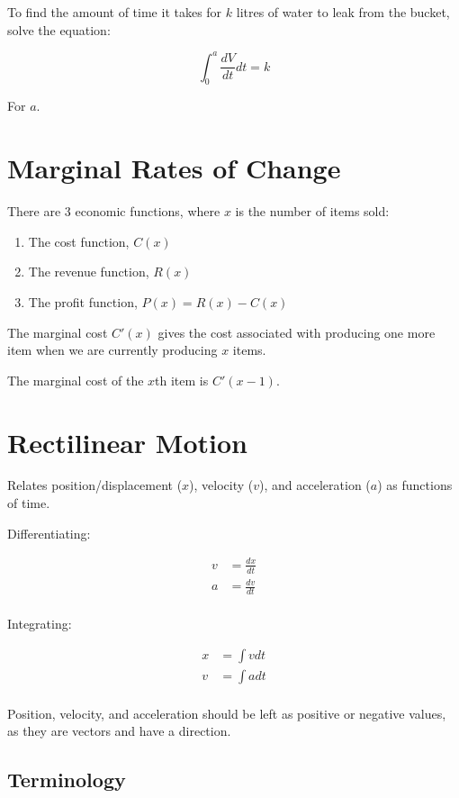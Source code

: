 \documentclass[a4paper,11pt]{article}
\begin{document}
To find the amount of time it takes for $k$ litres of water to leak from the
bucket, solve the equation:

$$
\int_0^a \frac{dV}{dt} dt = k
$$

For $a$.




\section{Marginal Rates of Change}

There are 3 economic functions, where $x$ is the number of items sold:

\begin{enumerate}
\item The cost function, $C(x)$
\item The revenue function, $R(x)$
\item The profit function, $P(x) = R(x) - C(x)$
\end{enumerate}

The marginal cost $C'(x)$ gives the cost associated with producing one more
item when we are currently producing $x$ items.

The marginal cost of the $x$th item is $C'(x - 1)$.




\section{Rectilinear Motion}

Relates position/displacement ($x$), velocity ($v$), and acceleration ($a$) as
functions of time.

Differentiating:

$$
\begin{aligned}
v & = \frac{dx}{dt} \\
a & = \frac{dv}{dt} \\
\end{aligned}
$$

Integrating:

$$
\begin{aligned}
x & = \int v dt \\
v & = \int a dt \\
\end{aligned}
$$

Position, velocity, and acceleration should be left as positive or negative
values, as they are vectors and have a direction.


\subsection{Terminology}
\end{document}
